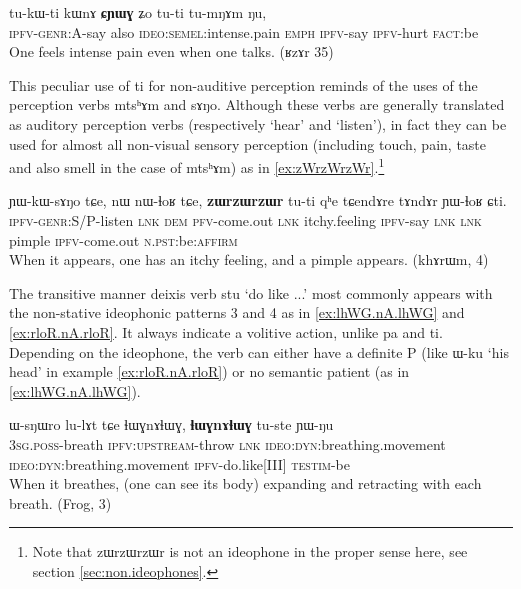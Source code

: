 \documentclass[oldfontcommands,oneside,a4paper,11pt]{article}
\newcommand{\ipa}[1]{{\phon \mbox{#1}}} %
\begin{document}
\begin{exe}
\ex \label{ex:CYWG.Zo}
\gll
\ipa{tu-kɯ-ti} 	\ipa{kɯnɤ} 	\ipa{\textbf{ɕɲɯɣ}} 	\ipa{ʑo} 	\ipa{tu-ti} 	\ipa{tu-mŋɤm} 	\ipa{ŋu,} \\
\textsc{ipfv-genr:A}-say also \textsc{ideo:semel}:intense.pain \textsc{emph} \textsc{ipfv}-say \textsc{ipfv}-hurt \textsc{fact}:be \\
\glt One feels intense pain even when one talks. (ʁzɤr 35)
\end{exe}

This peculiar use of \ipa{ti} for non-auditive perception reminds of the uses of the perception verbs  \ipa{mtsʰɤm} and \ipa{sɤŋo}. Although these verbs are generally translated as auditory perception verbs (respectively `hear' and `listen'), in fact they    can be used for almost all  non-visual sensory perception (including touch, pain, taste and also smell in the case of    \ipa{mtsʰɤm}) as in \ref{ex:zWrzWrzWr}.\footnote{Note that \ipa{zɯrzɯrzɯr}  is not an ideophone in the proper sense here, see section \ref{sec:non.ideophones}. }
 
\begin{exe}
\ex \label{ex:zWrzWrzWr}
\gll
\ipa{ɲɯ-kɯ-sɤŋo} 	\ipa{tɕe,} 	\ipa{nɯ} 	\ipa{nɯ-ɬoʁ} 	\ipa{tɕe,} 	\ipa{\textbf{zɯrzɯrzɯr}} 	\ipa{tu-ti} 	\ipa{qʰe} 	\ipa{tɕendɤre} 	\ipa{tɤndɤr} 	\ipa{ɲɯ-ɬoʁ} 	\ipa{ɕti.} 	\\
\textsc{ipfv-genr}:S/P-listen \textsc{lnk} \textsc{dem} \textsc{pfv}-come.out \textsc{lnk} itchy.feeling \textsc{ipfv}-say \textsc{lnk}  \textsc{lnk} pimple \textsc{ipfv}-come.out \textsc{n.pst:}be:\textsc{affirm} \\
\glt When it appears, one has an itchy feeling, and a pimple appears. (khɤrɯm, 4)
\end{exe}

The transitive manner deixis verb \ipa{stu} `do like ...' most commonly appears with the non-stative ideophonic patterns 3 and 4 as in \ref{ex:lhWG.nA.lhWG} and \ref{ex:rloR.nA.rloR}. It always indicate a volitive action, unlike \ipa{pa} and \ipa{ti}. Depending on the ideophone, the verb can either have a definite P (like \ipa{ɯ-ku} `his head' in example \ref{ex:rloR.nA.rloR}) or no semantic patient (as in \ref{ex:lhWG.nA.lhWG}).

\begin{exe}
\ex \label{ex:lhWG.nA.lhWG}
\gll
\ipa{ɯ-sŋɯro} 	\ipa{lu-lɤt} 	\ipa{tɕe} 	\ipa{ɬɯɣnɤɬɯɣ,} 	\ipa{\textbf{ɬɯɣnɤɬɯɣ}} 	\ipa{tu-ste} 	\ipa{ɲɯ-ŋu} \\
\textsc{3sg.poss}-breath \textsc{ipfv:upstream}-throw \textsc{lnk} \textsc{ideo:dyn}:breathing.movement \textsc{ideo:dyn}:breathing.movement \textsc{ipfv}-do.like[III] \textsc{testim}-be \\
\glt When it breathes, (one can see its body) expanding and retracting with each breath. (Frog, 3)
\end{exe}
\end{document}
